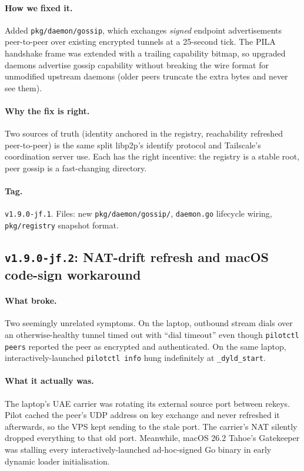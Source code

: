 \documentclass[11pt,a4paper]{article}
\begin{document}
\paragraph{How we fixed it.} Added \texttt{pkg/daemon/gossip},
which exchanges \emph{signed} endpoint advertisements
peer-to-peer over existing encrypted tunnels at a 25-second
tick. The PILA handshake frame was extended with a trailing
capability bitmap, so upgraded daemons advertise gossip
capability without breaking the wire format for unmodified
upstream daemons (older peers truncate the extra bytes and
never see them).

\paragraph{Why the fix is right.} Two sources of truth (identity
anchored in the registry, reachability refreshed peer-to-peer)
is the same split libp2p's identify protocol and Tailscale's
coordination server use. Each has the right incentive: the
registry is a stable root, peer gossip is a fast-changing
directory.

\paragraph*{Tag.} \texttt{v1.9.0-jf.1}. Files: new
\texttt{pkg/daemon/gossip/}, \texttt{daemon.go} lifecycle wiring,
\texttt{pkg/registry} snapshot format.

\subsection{\texttt{v1.9.0-jf.2}: NAT-drift refresh and macOS
code-sign workaround}

\paragraph{What broke.} Two seemingly unrelated symptoms. On the
laptop, outbound stream dials over an otherwise-healthy tunnel
timed out with ``dial timeout'' even though \texttt{pilotctl
peers} reported the peer as encrypted and authenticated. On the
same laptop, interactively-launched \texttt{pilotctl info} hung
indefinitely at \texttt{\_dyld\_start}.

\paragraph{What it actually was.} The laptop's UAE carrier was
rotating its external source port between rekeys. Pilot cached
the peer's UDP address on key exchange and never refreshed it
afterwards, so the VPS kept sending to the stale port. The
carrier's NAT silently dropped everything to that old port.
Meanwhile, macOS 26.2 Tahoe's Gatekeeper was stalling every
interactively-launched ad-hoc-signed Go binary in early dynamic
loader initialisation.
\end{document}
